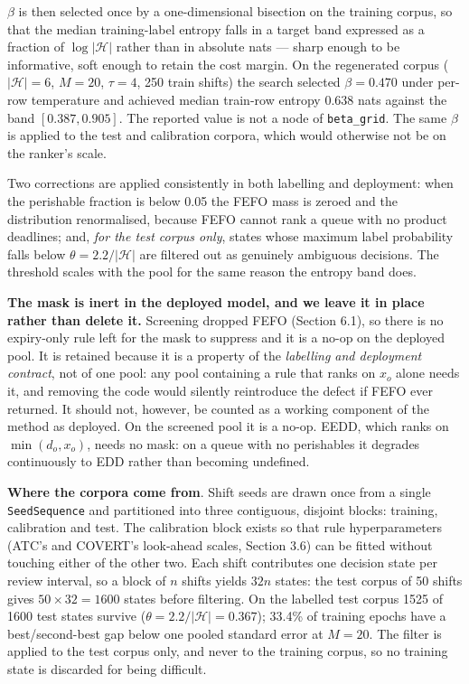 \documentclass[review,3p,times]{elsarticle}
\theoremstyle{definition}
\begin{document}
\(\beta\) is then selected once by a one-dimensional bisection on the
training corpus, so that the median training-label entropy falls in a
target band expressed as a fraction of \(\log|\mathcal{H}|\) rather than
in absolute nats --- sharp enough to be informative, soft enough to
retain the cost margin. On the regenerated corpus (\(|\mathcal{H}|=6\),
\(M=20\), \(\tau=4\), 250 train shifts) the search selected
\(\beta = 0.470\) under per-row temperature and achieved median
train-row entropy \(0.638\) nats against the band \([0.387, 0.905]\).
The reported value is not a node of \texttt{beta\_grid}. The same
\(\beta\) is applied to the test and calibration corpora, which would
otherwise not be on the ranker's scale.

Two corrections are applied consistently in both labelling and
deployment: when the perishable fraction is below 0.05 the FEFO mass is
zeroed and the distribution renormalised, because FEFO cannot rank a
queue with no product deadlines; and, \emph{for the test corpus only},
states whose maximum label probability falls below
\(\theta = 2.2/|\mathcal{H}|\) are filtered out as genuinely ambiguous
decisions. The threshold scales with the pool for the same reason the
entropy band does.

\textbf{The mask is inert in the deployed model, and we leave it in
place rather than delete it.} Screening dropped FEFO (Section 6.1), so
there is no expiry-only rule left for the mask to suppress and it is a
no-op on the deployed pool. It is retained because it is a property of
the \emph{labelling and deployment contract}, not of one pool: any pool
containing a rule that ranks on \(x_o\) alone needs it, and removing the
code would silently reintroduce the defect if FEFO ever returned. It
should not, however, be counted as a working component of the method as
deployed. On the screened pool it is a no-op. EEDD, which ranks on
\(\min(d_o, x_o)\), needs no mask: on a queue with no perishables it
degrades continuously to EDD rather than becoming undefined.

\textbf{Where the corpora come from}. Shift seeds are drawn once from a
single \texttt{SeedSequence} and partitioned into three contiguous,
disjoint blocks: training, calibration and test. The calibration block
exists so that rule hyperparameters (ATC's and COVERT's look-ahead
scales, Section 3.6) can be fitted without touching either of the other
two. Each shift contributes one decision state per review interval, so a
block of \(n\) shifts yields \(32n\) states: the test corpus of 50
shifts gives \(50 \times 32 = 1600\) states before filtering. On the
labelled test corpus 1525 of 1600 test states survive
(\(\theta = 2.2/|\mathcal{H}| = 0.367\)); 33.4\% of training epochs have
a best/second-best gap below one pooled standard error at \(M=20\). The
filter is applied to the test corpus only, and never to the training
corpus, so no training state is discarded for being difficult.
\end{document}
